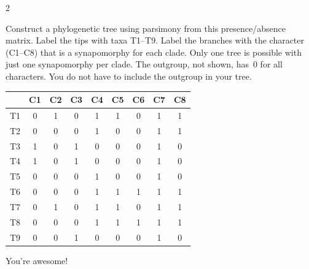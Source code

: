 \documentclass[12pt, addpoints]{exam}
\newcommand*\AnswerBox[2]{%
    \parbox[t][#1]{0.92\textwidth}{%
    \begin{solution}#2\end{solution}}
    \vspace{\stretch{1}}
}
\begin{document}
\begin{questions}
%

%

\newpage

\setlength{\columnsep}{20pt}

\question[12]
\begin{multicols}{2}
{\lining Construct a phylogenetic tree using parsimony from this presence/absence matrix. Label the tips with taxa T1–T9. Label the branches with the character (C1–C8) that is a synapomorphy for each clade. Only one tree is possible with just one synapomorphy per clade. The outgroup, not shown, has~0 for all characters. You do not have to include the outgroup in your tree.

\columnbreak

\begin{tabular}{@{}ccccccccc@{}}
\toprule
 & C1 & C2 & C3 & C4 & C5 & C6 & C7 & C8 \\
\midrule
T1 & 0 & 1 & 0 & 1 & 1 & 0 & 1 & 1 \\
T2 & 0 & 0 & 0 & 1 & 0 & 0 & 1 & 1 \\
T3 & 1 & 0 & 1 & 0 & 0 & 0 & 1 & 0 \\
T4 & 1 & 0 & 1 & 0 & 0 & 0 & 1 & 0 \\
T5 & 0 & 0 & 0 & 1 & 0 & 0 & 1 & 0 \\
T6 & 0 & 0 & 0 & 1 & 1 & 1 & 1 & 1 \\
T7 & 0 & 1 & 0 & 1 & 1 & 0 & 1 & 1 \\
T8 & 0 & 0 & 0 & 1 & 1 & 1 & 1 & 1 \\
T9 & 0 & 0 & 1 & 0 & 0 & 0 & 1 & 0 \\
\bottomrule
\end{tabular}}


\end{multicols}





\end{questions}


\newpage


\rhead{} %
\rfoot{} %

\vspace*{\fill}

\hspace*{\fill} {\tiny You're awesome!} \hspace*{\fill}

\vspace*{\fill}
\end{document}
